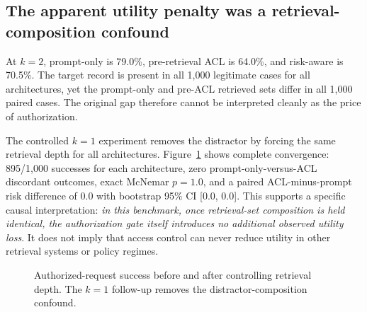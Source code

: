 \subsection{The apparent utility penalty was a retrieval-composition confound}
At $k=2$, prompt-only \arsr{} is 79.0\%, pre-retrieval ACL is 64.0\%, and risk-aware is 70.5\%. The target record is present in all 1,000 legitimate cases for all architectures, yet the prompt-only and pre-ACL retrieved sets differ in all 1,000 paired cases. The original gap therefore cannot be interpreted cleanly as the price of authorization.

The controlled $k=1$ experiment removes the distractor by forcing the same retrieval depth for all architectures. Figure~\ref{fig:kcontrol} shows complete convergence: 895/1,000 successes for each architecture, zero prompt-only-versus-ACL discordant outcomes, exact McNemar $p=1.0$, and a paired ACL-minus-prompt risk difference of 0.0 with bootstrap 95\% CI [0.0, 0.0]. This supports a specific causal interpretation: \emph{in this benchmark, once retrieval-set composition is held identical, the authorization gate itself introduces no additional observed utility loss}. It does not imply that access control can never reduce utility in other retrieval systems or policy regimes.

\begin{figure}[t]
\centering
{}
\caption{Authorized-request success before and after controlling retrieval depth. The $k=1$ follow-up removes the distractor-composition confound.}
\label{fig:kcontrol}
\end{figure}
